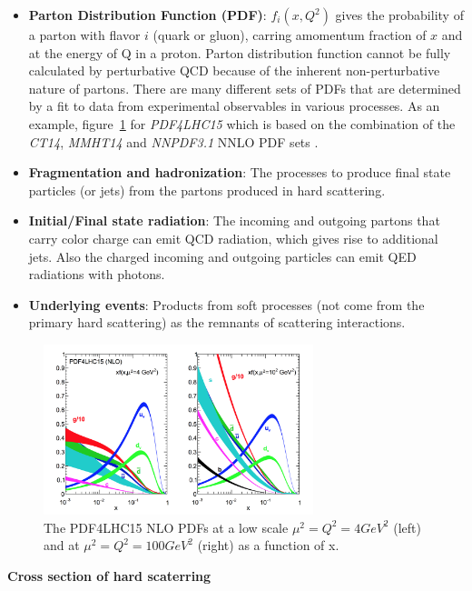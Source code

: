 \begin{itemize}
	\item \textbf{Parton Distribution Function (PDF)}: $f_{i}\left(x, Q^{2}\right)$ gives the probability of a parton with flavor $i$ (quark or gluon), carring amomentum fraction of $x$ and at the energy of Q in a proton. Parton distribution function cannot be fully calculated by perturbative QCD because of the inherent non-perturbative nature of partons. There are many different sets of PDFs that are determined by a fit to data from experimental observables in various processes. As an example, figure~\ref{fig:C2_PDF4LHC15} for \textit{PDF4LHC15} which is based on the combination of the \textit{CT14}, \textit{MMHT14} and \textit{NNPDF3.1} NNLO PDF sets \cite{Lin:2017snn}.
	\item \textbf{Fragmentation and hadronization}: The processes to produce final state particles (or jets) from the partons produced in hard scattering.
	\item \textbf{Initial/Final state radiation}: The incoming and outgoing partons that carry color charge can emit QCD radiation, which gives rise to additional jets. Also the charged incoming and outgoing particles can emit QED radiations with photons.
	\item \textbf{Underlying events}: Products from soft processes (not come from the primary hard scattering) as the remnants of scattering interactions.
\end{itemize}
\begin{figure}[!htb]
  \centering
  \includegraphics[width=0.7\textwidth]{figures/Theory/PDF4LHC15.png}
  \caption{The PDF4LHC15 NLO PDFs at a low scale $\mu^{2} = Q^{2} = 4 GeV^{2}$ (left) and at $\mu^{2} = Q^{2} = 100 GeV^{2}$ (right) as a function of x.}
  \label{fig:C2_PDF4LHC15}
\end{figure}

\textbf{Cross section of hard scaterring} 

